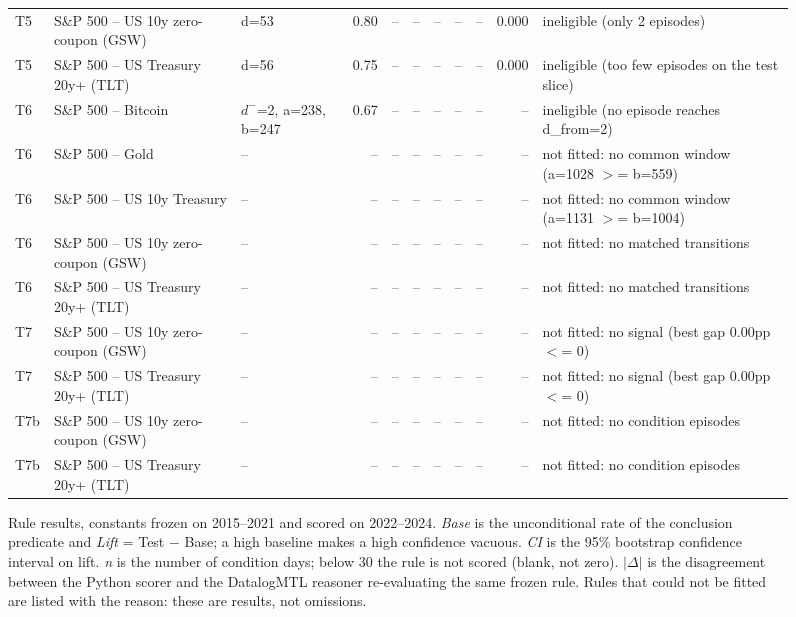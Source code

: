 \begin{figure}
\begin{tabular}{lllrrrrrrrl}
T5 & S\&P 500 -- US 10y zero-coupon (GSW) & d=53 & 0.80 & -- & -- & -- & -- & -- & 0.000 & ineligible (only 2 episodes) \\
T5 & S\&P 500 -- US Treasury 20y+ (TLT) & d=56 & 0.75 & -- & -- & -- & -- & -- & 0.000 & ineligible (too few episodes on the test slice) \\
T6 & S\&P 500 -- Bitcoin & $d^-$=2, a=238, b=247 & 0.67 & -- & -- & -- & -- & -- & -- & ineligible (no episode reaches d\_from=2) \\
T6 & S\&P 500 -- Gold & -- & -- & -- & -- & -- & -- & -- & -- & not fitted: no common window (a=1028 $>$= b=559) \\
T6 & S\&P 500 -- US 10y Treasury & -- & -- & -- & -- & -- & -- & -- & -- & not fitted: no common window (a=1131 $>$= b=1004) \\
T6 & S\&P 500 -- US 10y zero-coupon (GSW) & -- & -- & -- & -- & -- & -- & -- & -- & not fitted: no matched transitions \\
T6 & S\&P 500 -- US Treasury 20y+ (TLT) & -- & -- & -- & -- & -- & -- & -- & -- & not fitted: no matched transitions \\
T7 & S\&P 500 -- US 10y zero-coupon (GSW) & -- & -- & -- & -- & -- & -- & -- & -- & not fitted: no signal (best gap 0.00pp $<$= 0) \\
T7 & S\&P 500 -- US Treasury 20y+ (TLT) & -- & -- & -- & -- & -- & -- & -- & -- & not fitted: no signal (best gap 0.00pp $<$= 0) \\
T7b & S\&P 500 -- US 10y zero-coupon (GSW) & -- & -- & -- & -- & -- & -- & -- & -- & not fitted: no condition episodes \\
T7b & S\&P 500 -- US Treasury 20y+ (TLT) & -- & -- & -- & -- & -- & -- & -- & -- & not fitted: no condition episodes \\
\bottomrule
\end{tabular}
\caption{\small{Rule results, constants frozen on 2015--2021 and scored on 2022--2024. \emph{Base} is the unconditional rate of the conclusion predicate and \emph{Lift} = Test $-$ Base; a high baseline makes a high confidence vacuous. \emph{CI} is the 95\% bootstrap confidence interval on lift. \emph{n} is the number of condition days; below 30 the rule is not scored (blank, not zero). $|\Delta|$ is the disagreement between the Python scorer and the DatalogMTL reasoner re-evaluating the same frozen rule. Rules that could not be fitted are listed with the reason: these are results, not omissions.}}
\label{fig:rule-results_classifier}
\end{figure}
